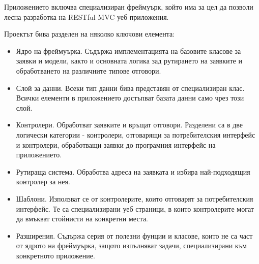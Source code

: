 Приложението включва специализиран фреймуърк, който има
за цел да позволи лесна разработка на RESTful MVC уеб
приложения. 

Проектът бива разделен на няколко ключови елемента:
\begin{itemize}
    \item Ядро на фреймуърка. Съдържа имплементацията
        на базовите класове за заявки и модели, както и
        основната логика зад рутирането на заявките и
        обработването на различните типове отговори.
    \item Слой за данни. Всеки тип данни бива представян
        от специализиран клас. Всички елементи в
        приложението достъпват базата данни само
        чрез този слой.
    \item Контролери. Обработват заявките и връщат
        отговори. Разделени са в две логически категории -
        контролери, отговарящи за потребителския
        интерфейс и контролери, обработващи заявки до
        програмния интерфейс на приложението.
    \item Рутираща система. Обработва адреса на заявката
        и избира най-подходящия контролер за нея.
    \item Шаблони. Използват се от контролерите, които
        отговарят за потребителския интерфейс. Те са
        специализирани уеб страници, в които контролерите
        могат да вмъкват стойнисти на конкретни места.
    \item Разширения. Съдържа серия от полезни фунции и
        класове, които не са част от ядрото на фреймуърка,
        защото изпълняват задачи, специализирани към
        конкретното приложение.
\end{itemize}

